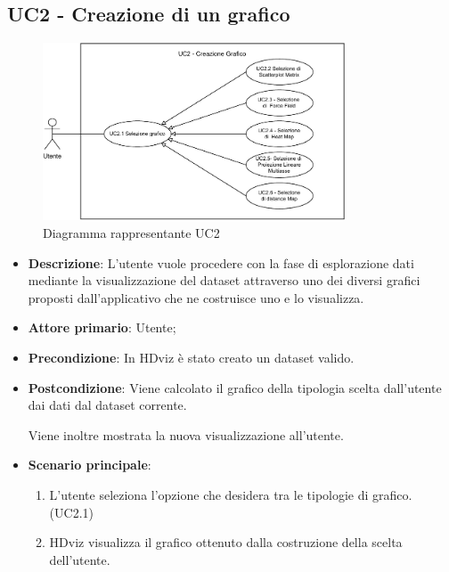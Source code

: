 \newpage

\subsection{UC2 - Creazione di un grafico}
\label{sub:uc2}

\begin{figure}[h]
    \centering
    \includegraphics[width=0.8\textwidth]{componenti/casi-duso/diagrammi/UC2.pdf}
    \caption{Diagramma rappresentante UC2}
    \label{fig:UC2}
\end{figure}


\begin{itemize}
    \item \textbf{Descrizione}: L’utente vuole procedere con la fase di esplorazione
                                dati mediante la visualizzazione del dataset
                                attraverso uno dei diversi grafici proposti dall’applicativo
                                che ne costruisce uno e lo visualizza.
	
    \item \textbf{Attore primario}: Utente;
    
    \item \textbf{Precondizione}:   In HDviz è stato creato un dataset valido.

    \item \textbf{Postcondizione}:  Viene calcolato il grafico della tipologia scelta dall'utente dai dati 
									dal dataset corrente. 
									
									Viene inoltre mostrata la nuova visualizzazione all'utente.

	\item \textbf{Scenario principale}:
		\begin{enumerate}
			\item L'utente seleziona l'opzione che desidera tra le tipologie di grafico. (UC2.1)
			\item HDviz visualizza il grafico ottenuto dalla costruzione della scelta dell'utente.
		\end{enumerate}
\end{itemize}

